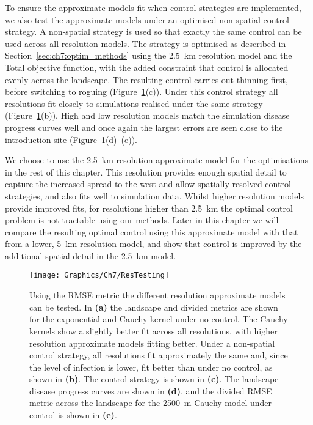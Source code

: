 To ensure the approximate models fit when control strategies are implemented, we also test the approximate models under an optimised non-spatial control strategy. A non-spatial strategy is used so that exactly the same control can be used across all resolution models. The strategy is optimised as described in Section~\ref{sec:ch7:optim_methods} using the \SI{2.5}{\km} resolution model and the Total objective function, with the added constraint that control is allocated evenly across the landscape. The resulting control carries out thinning first, before switching to roguing (Figure~\ref{fig:ch7:resolution_testing}(c)). Under this control strategy all resolutions fit closely to simulations realised under the same strategy (Figure~\ref{fig:ch7:resolution_testing}(b)). High and low resolution models match the simulation disease progress curves well and once again the largest errors are seen close to the introduction site (Figure~\ref{fig:ch7:resolution_testing}(d)--(e)).

We choose to use the \SI{2.5}{\km} resolution approximate model for the optimisations in the rest of this chapter. This resolution provides enough spatial detail to capture the increased spread to the west and allow spatially resolved control strategies, and also fits well to simulation data. Whilst higher resolution models provide improved fits, for resolutions higher than \SI{2.5}{\km} the optimal control problem is not tractable using our methods. Later in this chapter we will compare the resulting optimal control using this approximate model with that from a lower, \SI{5}{\km} resolution model, and show that control is improved by the additional spatial detail in the \SI{2.5}{\km} model.

\begin{figure}
    \begin{center}
        \texttt{[image: Graphics/Ch7/ResTesting]}
        \caption[Using the RMSE metric to test the approximate models]{Using the RMSE metric the different resolution approximate models can be tested. In \textbf{(a)} the landscape and divided metrics are shown for the exponential and Cauchy kernel under no control. The Cauchy kernels show a slightly better fit across all resolutions, with higher resolution approximate models fitting better. Under a non-spatial control strategy, all resolutions fit approximately the same and, since the level of infection is lower, fit better than under no control, as shown in \textbf{(b)}. The control strategy is shown in \textbf{(c)}. The landscape disease progress curves are shown in \textbf{(d)}, and the divided RMSE metric across the landscape for the \SI{2500}{\meter} Cauchy model under control is shown in \textbf{(e)}.\label{fig:ch7:resolution_testing}}
    \end{center}
\end{figure}

